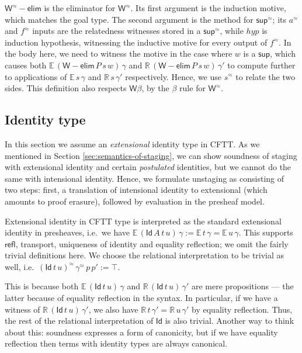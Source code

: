 \documentclass[acmsmall,screen]{acmart}
\newcommand{\msf}[1]{{\mathsf{#1}}}
\newcommand{\mbb}[1]{\mathbb{#1}}
\newcommand{\rel}{^{\approx}}
\newcommand{\Id}{\msf{Id}}
\newcommand{\ev}{\mbb{E}}
\newcommand{\re}{\mbb{R}}
\newcommand{\welim}{\vW{-}\msf{elim}}
\newcommand{\vW}{\mathsf{W}}
\newcommand{\vsup}{\mathsf{sup}}
\theoremstyle{remark}
\begin{document}
$\vW\rel{-}\msf{elim}$ is the eliminator for $\vW\rel$. Its first argument is
the induction motive, which matches the goal type. The second argument is the
method for $\vsup\rel$; its $a\rel$ and $f\rel$ inputs are the relatedness
witnesses stored in a $\vsup\rel$, while $\mathit{hyp}$ is induction hypothesis,
witnessing the inductive motive for every output of $f\rel$. In the body here,
we need to witness the motive in the case where $w$ is a $\vsup$, which causes
both $\ev\,(\welim\,P\,s\,w)\,\gamma$ and $\re\,(\welim\,P\,s\,w)\,\gamma'$ to
compute further to applications of $\ev\,s\,\gamma$ and $\re\,s\,\gamma'$
respectively. Hence, we use $s\rel$ to relate the two sides. This definition
also respects $\vW\beta$, by the $\beta$ rule for $\vW\rel$.

\subsection{Identity type}

In this section we assume an \emph{extensional} identity type in CFTT. As we
mentioned in Section \ref{sec:semantics-of-staging}, we can show soundness of staging with
extensional identity and certain \emph{postulated} identities, but we cannot do
the same with intensional identity. Hence, we formulate unstaging as consisting
of two steps: first, a translation of intensional identity to extensional (which
amounts to proof erasure), followed by evaluation in the presheaf model.

Extensional identity in CFTT type is interpreted as the standard extensional
identity in presheaves, i.e.\ we have $\ev\,(\msf{Id}\,A\,t\,u)\,\gamma :=
\ev\,t\,\gamma = \ev\,u\,\gamma$. This supports $\msf{refl}$, transport,
uniqueness of identity and equality reflection; we omit the fairly trivial
definitions here. We choose the relational interpretation to be trivial as well,
i.e.\ $(\msf{Id}\,t\,u)\rel\,\gamma\rel\,p\,p' := \top$.

This is because both $\ev\,(\Id\,t\,u)\,\gamma$ and $\re\,(\Id\,t\,u)\,\gamma'$
are mere propositions --- the latter because of equality reflection in the
syntax.  In particular, if we have a witness of $\re\,(\Id\,t\,u)\,\gamma'$, we
also have $\re\,t\,\gamma' = \re\,u\,\gamma'$ by equality reflection. Thus, the
rest of the relational interpretation of $\Id$ is also trivial. Another way to
think about this: soundness expresses a form of canonicity, but if we have
equality reflection then terms with identity types are always canonical.
\end{document}
